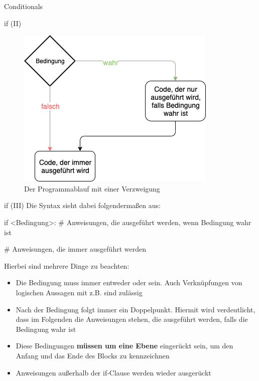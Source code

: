 \begin{subsection}{Conditionals}
        \begin{frame}{if (II)}
            \begin{figure}
                \centering
                \includegraphics[width=0.7\linewidth, keepaspectratio]{chapters/09_python3_control_flow/figures/if.png}
                \caption{Der Programmablauf mit einer Verzweigung}
                \label{fig:if}
            \end{figure}
        \end{frame}
    
        \begin{frame}[fragile]{if (III)}
            Die Syntax sieht dabei folgendermaßen aus:
            
\begin{pythoncode}
if <Bedingung>:
    # Anweisungen, die ausgeführt werden, wenn Bedingung wahr ist

# Anweisungen, die immer ausgeführt werden
\end{pythoncode}

            Hierbei sind mehrere Dinge zu beachten:
            
            \begin{itemize}
                \item Die Bedingung muss immer entweder  oder  sein. Auch Verknüpfungen von logischen Aussagen mit z.B.  sind zulässig
                \item Nach der Bedingung folgt immer ein Doppelpunkt. Hiermit wird verdeutlicht, dass im Folgenden die Anweisungen stehen, die ausgeführt werden, falls die Bedingung wahr ist
                \item Diese Bedingungen \textbf{müssen um eine Ebene} eingerückt sein, um den Anfang und das Ende des Blocks zu kennzeichnen
                \item Anweisungen außerhalb der if-Clause werden wieder ausgerückt
            \end{itemize}
        

\end{frame}
\end{subsection}
